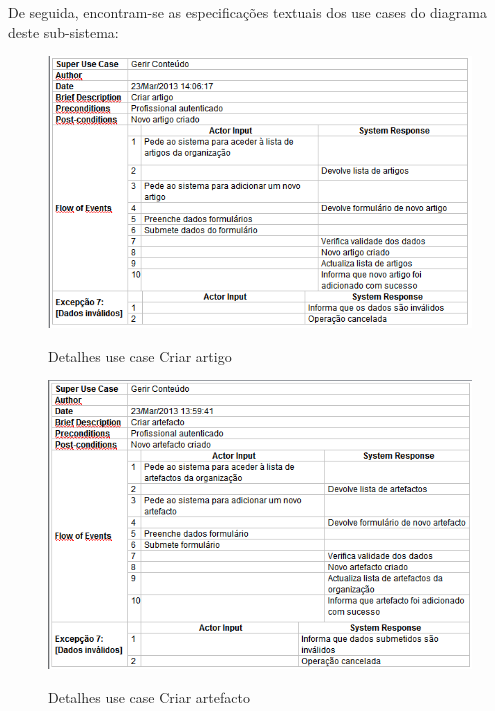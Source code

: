 ﻿\documentclass[12pt,a4paper]{article}
\begin{document}
De seguida, encontram-se as especificações textuais dos use cases do diagrama deste sub-sistema:\\

\begin{figure}[h!]
\centering
\includegraphics[scale=0.7]{d_usecase/criarartigo}
\label{usecase}
\caption{Detalhes use case Criar artigo}
\end{figure}

\begin{figure}[h!]
\centering
\includegraphics[scale=0.7]{d_usecase/criarartefacto}
\label{usecase}
\caption{Detalhes use case Criar artefacto}
\end{figure}
\end{document}
